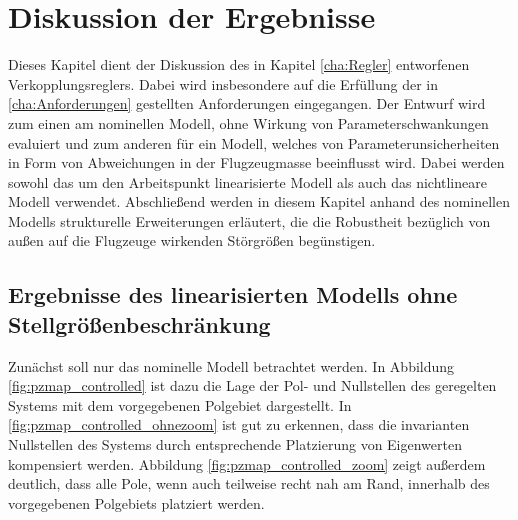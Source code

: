 \chapter{Diskussion der Ergebnisse}\label{cha:Robustheit}
Dieses Kapitel dient der Diskussion des in Kapitel \ref{cha:Regler} entworfenen Verkopplungsreglers. Dabei wird insbesondere auf die Erfüllung der in \ref{cha:Anforderungen} gestellten Anforderungen eingegangen. Der Entwurf wird zum einen am nominellen Modell, ohne Wirkung von Parameterschwankungen evaluiert und zum anderen für ein Modell, welches von Parameterunsicherheiten in Form von Abweichungen in der Flugzeugmasse beeinflusst wird. Dabei werden sowohl das um den Arbeitspunkt linearisierte Modell als auch das nichtlineare Modell verwendet. Abschließend werden in diesem Kapitel anhand des nominellen Modells strukturelle Erweiterungen erläutert, die die Robustheit bezüglich von außen auf die Flugzeuge wirkenden Störgrößen begünstigen.

\section{Ergebnisse des linearisierten Modells ohne Stellgrößenbeschränkung}
Zunächst soll nur das nominelle Modell betrachtet werden. In Abbildung \ref{fig:pzmap_controlled} ist dazu die Lage der Pol- und Nullstellen des geregelten Systems mit dem vorgegebenen Polgebiet dargestellt. In \ref{fig:pzmap_controlled_ohnezoom} ist gut zu erkennen, dass die invarianten Nullstellen des Systems durch entsprechende Platzierung von Eigenwerten kompensiert werden. Abbildung \ref{fig:pzmap_controlled_zoom} zeigt außerdem deutlich, dass alle Pole, wenn auch teilweise recht nah am Rand, innerhalb des vorgegebenen Polgebiets platziert werden.

